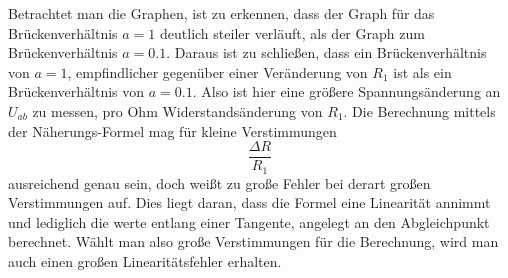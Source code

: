 Betrachtet man die Graphen, ist zu erkennen, dass der Graph für das Brückenverhältnis \( a = 1 \)
deutlich steiler verläuft, als der Graph zum Brückenverhältnis \( a = 0.1 \).
Daraus ist zu schließen, dass ein Brückenverhältnis von \( a = 1 \),
empfindlicher gegenüber einer Veränderung von \( R_1 \) ist als ein Brückenverhältnis von \( a = 0.1 \).
Also ist hier eine größere Spannungsänderung an \( U_{ab} \) zu messen, pro Ohm Widerstandsänderung von \( R_1 \).
Die Berechnung mittels der Näherungs-Formel mag für kleine Verstimmungen
\[ \frac{\Delta R}{R_1} \]
ausreichend genau sein,
doch weißt zu große Fehler bei derart großen Verstimmungen auf.
Dies liegt daran, dass die Formel eine Linearität annimmt und lediglich die werte entlang einer Tangente,
angelegt an den Abgleichpunkt berechnet.
Wählt man also große Verstimmungen für die Berechnung, wird man auch einen großen Linearitätsfehler erhalten.
